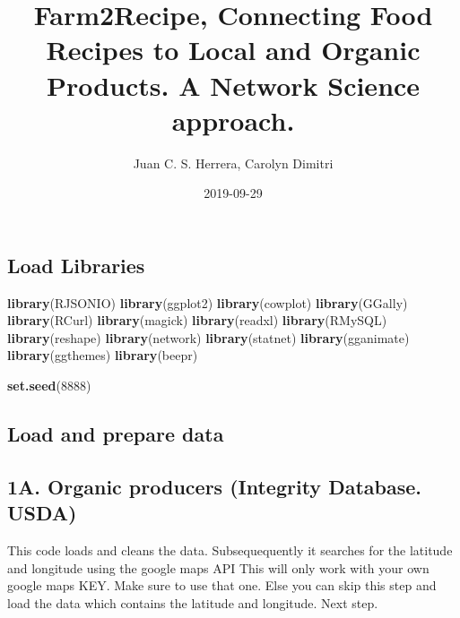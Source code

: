 \documentclass[]{article}
\title{Farm2Recipe, Connecting Food Recipes to Local and Organic Products. A
Network Science approach.}
\author{Juan C. S. Herrera, Carolyn Dimitri}
\date{2019-09-29}
\newenvironment{Shaded}{\begin{snugshade}}{\end{snugshade}}
\newcommand{\KeywordTok}[1]{\textcolor[rgb]{0.13,0.29,0.53}{\textbf{#1}}}
\newcommand{\DecValTok}[1]{\textcolor[rgb]{0.00,0.00,0.81}{#1}}
\newcommand{\NormalTok}[1]{#1}
\begin{document}
\maketitle

\subsection{Load Libraries}\label{load-libraries}

\begin{Shaded}
\begin{Highlighting}[]
  \KeywordTok{library}\NormalTok{(RJSONIO)}
  \KeywordTok{library}\NormalTok{(ggplot2)}
  \KeywordTok{library}\NormalTok{(cowplot)}
  \KeywordTok{library}\NormalTok{(GGally)}
  \KeywordTok{library}\NormalTok{(RCurl)}
  \KeywordTok{library}\NormalTok{(magick)}
  \KeywordTok{library}\NormalTok{(readxl)}
  \KeywordTok{library}\NormalTok{(RMySQL)}
  \KeywordTok{library}\NormalTok{(reshape)}
  \KeywordTok{library}\NormalTok{(network)}
  \KeywordTok{library}\NormalTok{(statnet)}
  \KeywordTok{library}\NormalTok{(gganimate)}
  \KeywordTok{library}\NormalTok{(ggthemes)}
  \KeywordTok{library}\NormalTok{(beepr)}

  \KeywordTok{set.seed}\NormalTok{(}\DecValTok{8888}\NormalTok{)}
\end{Highlighting}
\end{Shaded}

\subsection{Load and prepare data}\label{load-and-prepare-data}

\subsection{1A. Organic producers (Integrity Database.
USDA)}\label{a.-organic-producers-integrity-database.-usda}

This code loads and cleans the data. Subsequequently it searches for the
latitude and longitude using the google maps API This will only work
with your own google maps KEY. Make sure to use that one. Else you can
skip this step and load the data which contains the latitude and
longitude. Next step.
\end{document}
